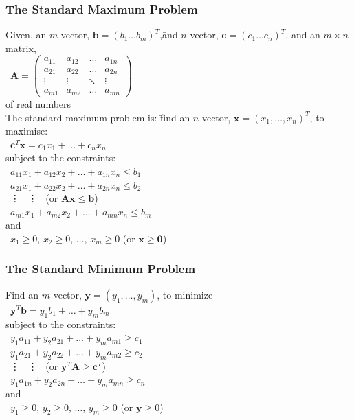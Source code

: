 \documentclass[10pt,letterpaper]{scrartcl}
\begin{document}
\subsubsection*{The Standard Maximum Problem}\begin{tabbing}
Given, an $m$-vector, $\mathbf{b}=(b_1\ldots b_m)^T$,\= and $n$-vector, $\mathbf{c}=(c_1\ldots c_n)^T$, and an $m\times n$ matrix, \\
\>\ $\displaystyle\mathbf{A} = \begin{pmatrix}
a_{11} & a_{12} & \ldots & a_{1n} \\ 
a_{21} & a_{22} & \ldots & a_{2n} \\
\vdots & \vdots & \ddots & \vdots \\
a_{m1} & a_{m2} & \ldots & a_{mn} 
\end{pmatrix}$ \\
of real numbers \\ 
The standard maximum problem is: \= find an $n$-vector, $\mathbf{x}=(x_1,\ldots , x_n)^T$, to maximise: \\
\>\ $\mathbf{c}^T\mathbf{x}=c_1x_1+\ldots +c_nx_n$ \\
subject to the constraints: \\ 
\>\ $a_{11}x_1 + a_{12}x_2 + \ldots + a_{1n}x_n \leq b_1$ \\
\>\ $a_{21}x_1 + a_{22}x_2 + \ldots + a_{2n}x_n \leq b_2$ \\
\>\ \vdots\ \hspace{12em} \vdots\ \hspace{2em} \=(or $\mathbf{Ax}\leq \mathbf{b}$) \\
\>\ $a_{m1}x_1 + a_{m2}x_2 + \ldots + a_{mn}x_n \leq b_m$ \\

and \\
\>\ $x_1 \geq 0$, $x_2 \geq 0$, $\ldots$, $x_m \geq 0$ \> (or $\mathbf{x} \geq \mathbf{0}$)\end{tabbing}
\subsubsection*{The Standard Minimum Problem}\begin{tabbing}
Find an $m$-vector, $\mathbf{y}=(y_1,\ldots , y_m)$, to minimize \= \\
\>\ $\mathbf{y}^T\mathbf{b}=y_1b_1 + \ldots + y_mb_m$ \\
subject to the constraints: \\
\>\ $y_1a_{11} + y_2a_{21} + \ldots + y_ma_{m1} \geq c_1$ \\
\>\ $y_1a_{21} + y_2a_{22} + \ldots + y_ma_{m2} \geq c_2$ \\
\>\ \vdots\ \hspace{12em} \vdots\ \hspace{2em} \=(or $\mathbf{y}^T\mathbf{A}\geq \mathbf{c}^T$)\\
\>\ $y_1a_{1n} + y_2a_{2n} + \ldots + y_ma_{mn} \geq c_n$ \\
and \\
\>\ $y_1 \geq 0$, $y_2 \geq 0$, $\ldots$, $y_m\geq 0$ \> (or $\mathbf{y} \geq 0$)\end{tabbing}
\end{document}
